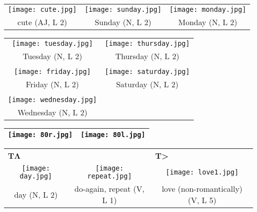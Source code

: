 \documentclass{tufte-book}
\newcommand{\sansnormal}{\sffamily\selectfont}
\begin{document}
\begin{fullwidth}
 \begin{table*}[h!]
\begin{tabular}{ccc}
   \texttt{[image: cute.jpg]}&\texttt{[image: sunday.jpg]}&\texttt{[image: monday.jpg]}\\
   cute (AJ, L 2)&Sunday (N, L 2)&Monday (N, L 2)\\%
  
  \end{tabular}
\end{table*}
\newpage
\begin{table*}[h!]
\begin{tabular}{cc}
\texttt{[image: tuesday.jpg]}&\texttt{[image: thursday.jpg]}\\
   Tuesday (N, L 2)&Thursday (N, L 2)\\
   &\\
   \texttt{[image: friday.jpg]}&\texttt{[image: saturday.jpg]}\\
   Friday (N, L 2)&Saturday (N, L 2)\\
   &\\
    \texttt{[image: wednesday.jpg]}&\\
    Wednesday (N, L 2)\\
   
   
  \end{tabular}
\end{table*}   

     \begin{table}[h!]
\begin{tabular}{|c|c|}
\hline
\texttt{[image: 80r.jpg]} & \texttt{[image: 80l.jpg]}\\
\hline
\end{tabular}
\label{page:80}
\end{table}

\begin{table*}[h!]
\begin{tabular}{ccc}
\multicolumn{1}{l}{{\sansnormal\textbf{T}}$\mathbf\Lambda$}&&\multicolumn{1}{l}{\textbf{{\sansnormal T}>}}  \\
\texttt{[image: day.jpg]}&\texttt{[image: repeat.jpg]}&\texttt{[image: love1.jpg]}\\
   day (N, L 2)&do-again, repeat (V, L 1)& love (non-romantically) (V, L 5)\\
  

\end{tabular}
\end{table*}
\end{fullwidth}
\end{document}
